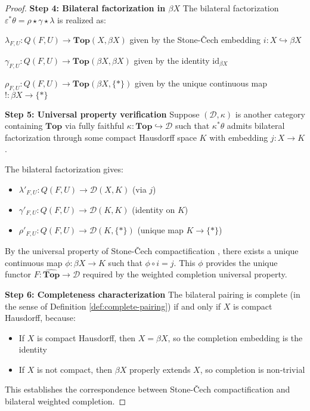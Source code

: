 \documentclass[11pt]{article}
\theoremstyle{plain}
\theoremstyle{definition}
\theoremstyle{remark}
\begin{document}
\begin{proof}
\textbf{Step 4: Bilateral factorization in $\beta X$}
The bilateral factorization $\varepsilon^* \theta = \rho \star \gamma \star \lambda$ is realized as:

$\lambda_{F,U} : Q(F, U) \to \mathbf{Top}(X, \beta X)$ given by the Stone-\v{C}ech embedding $i : X \hookrightarrow \beta X$

$\gamma_{F,U} : Q(F, U) \to \mathbf{Top}(\beta X, \beta X)$ given by the identity $\text{id}_{\beta X}$

$\rho_{F,U} : Q(F, U) \to \mathbf{Top}(\beta X, \{*\})$ given by the unique continuous map $! : \beta X \to \{*\}$

\textbf{Step 5: Universal property verification}
Suppose $(\mathcal{D}, \kappa)$ is another category containing $\mathbf{Top}$ via fully faithful $\kappa : \mathbf{Top} \hookrightarrow \mathcal{D}$ such that $\kappa^* \theta$ admits bilateral factorization through some compact Hausdorff space $K$ with embedding $j : X \to K$.

The bilateral factorization gives:
\begin{itemize}
\item $\lambda'_{F,U} : Q(F, U) \to \mathcal{D}(X, K)$ (via $j$)
\item $\gamma'_{F,U} : Q(F, U) \to \mathcal{D}(K, K)$ (identity on $K$)  
\item $\rho'_{F,U} : Q(F, U) \to \mathcal{D}(K, \{*\})$ (unique map $K \to \{*\}$)
\end{itemize}

By the universal property of Stone-\v{C}ech compactification \cite{stone1936theory}, there exists a unique continuous map $\phi : \beta X \to K$ such that $\phi \circ i = j$. This $\phi$ provides the unique functor $F : \widehat{\mathbf{Top}} \to \mathcal{D}$ required by the weighted completion universal property.

\textbf{Step 6: Completeness characterization}
The bilateral pairing is complete (in the sense of Definition \ref{def:complete-pairing}) if and only if $X$ is compact Hausdorff, because:
\begin{itemize}
\item If $X$ is compact Hausdorff, then $X = \beta X$, so the completion embedding is the identity
\item If $X$ is not compact, then $\beta X$ properly extends $X$, so completion is non-trivial
\end{itemize}

This establishes the correspondence between Stone-\v{C}ech compactification and bilateral weighted completion.
\end{proof}
\end{document}
